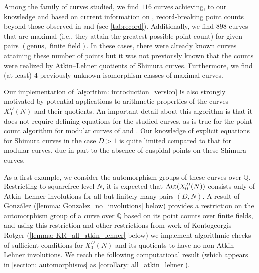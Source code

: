 \documentclass[11pt,reqno]{amsart}
\newcommand{\Q}{\mathbb{Q}}
\newcommand{\Aut}{{\rm Aut}}
\theoremstyle{definition}
\newcommand{\Pietro}[1]{{\color{orange}{??Pietro: #1}}} %
\newcommand{\freddy}[1]{{\color{purple}{$\spadesuit$ Freddy: #1}}}
\begin{document}
Among the family of curves studied, we find $116$ curves achieving, to our knowledge and based on current information on \cite{ManyPoints}, record-breaking point counts beyond those observed in \cite{DLMS} and \cite{DLMS26} (see \cref{tabrecord}). Additionally, we find $898$ curves that are maximal (i.e., they attain the greatest possible point count) %
for given pairs $(\text{genus}, \text{ finite field})$. In these cases, there were already known curves attaining these number of points but it was not previously known that the counts were realized by Atkin--Lehner quotients of Shimura curves. Furthermore, we find (at least) $4$ previously unknown isomorphism classes of maximal curves. %

Our implementation of \cref{algorithm: introduction_version} is also strongly motivated by potential applications to arithmetic properties of the curves $X_0^D(N)$ and their quotients. An important detail about this algorithm is that it does not require defining equations for the studied curves, as is true for the point count algorithm for modular curves of \cite{DLMS} and \cite{DLMS26}. Our knowledge of explicit equations for Shimura curves in the case $D>1$ is quite limited compared to that for modular curves, due in part to the absence of cuspidal points on these Shimura curves.

As a first example, we consider the automorphism groups of these curves over $\Q$. Restricting to squarefree level $N$, it is expected that $\Aut(X_0^D(N))$ consists only of Atkin--Lehner involutions for all but finitely many pairs $(D,N)$. A result of Gonz\'alez \cite{Gonzalez17} (\cref{lemma: Gonzalez_no_involutions} below) provides a restriction on the automorphism group of a curve over $\Q$ based on its point counts over finite fields, and using this restriction and other restrictions from work of Kontogeorgis--Rotger \cite{KR08} (\cref{lemma: KR_all_atkin_lehner} below) we implement algorithmic checks of sufficient conditions for $X_0^D(N)$ and its quotients to have no non-Atkin--Lehner involutions. We reach the following computational result (which appears in \cref{section: automorphisms} as \cref{corollary: all_atkin_lehner}). 
\end{document}
